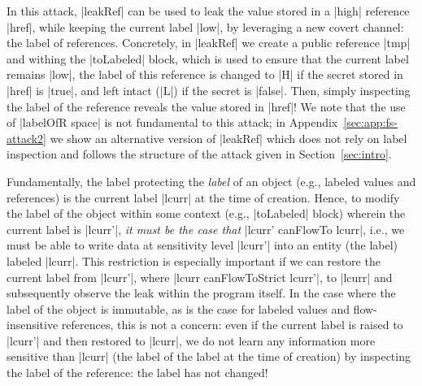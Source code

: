 %
In this attack, |leakRef| can be used to leak the value stored in a |high| reference
|href|, while keeping the current label |low|, by leveraging a new
covert channel: the label of references.
%
Concretely, in |leakRef| we create a public reference |tmp| and withing the
|toLabeled| block, which is used to ensure that the current label remains
|low|, the label of this reference is changed to |H| if the secret stored in
|href| is |true|, and left intact (|L|) if the secret is |false|.
%
Then, simply inspecting the label of the reference reveals the value stored in
|href|!
%
We note that the use of |labelOfR space| is not fundamental to this attack; in
Appendix~\ref{sec:app:fs-attack2} we show an alternative version of |leakRef|
which does not rely on label inspection and follows the structure of the attack
given in Section~\ref{sec:intro}.

Fundamentally, the label protecting the \emph{label} of an object (e.g.,
labeled values and references) is the current label |lcurr| at the time of
creation.
%
Hence, to modify the label of the object within some context (e.g., |toLabeled|
block) wherein the current label is |lcurr'|, \emph{it must be the case that} |lcurr'
canFlowTo lcurr|, i.e., we must be able to write data at sensitivity level
|lcurr'| into an entity (the label) labeled |lcurr|.
%
This restriction is especially important if we can restore the current label
from |lcurr'|, where |lcurr canFlowToStrict lcurr'|,  
to |lcurr| and subsequently observe the leak within the program itself.
%
In the case where the label of the object is immutable, as is the case for
labeled values and flow-insensitive references, this is not a concern: even if
the current label is raised to |lcurr'| and then restored to |lcurr|, we do not
learn any information more sensitive than |lcurr| (the label of the label at the
time of creation) by inspecting the label of the reference: the label has not
changed!
%

